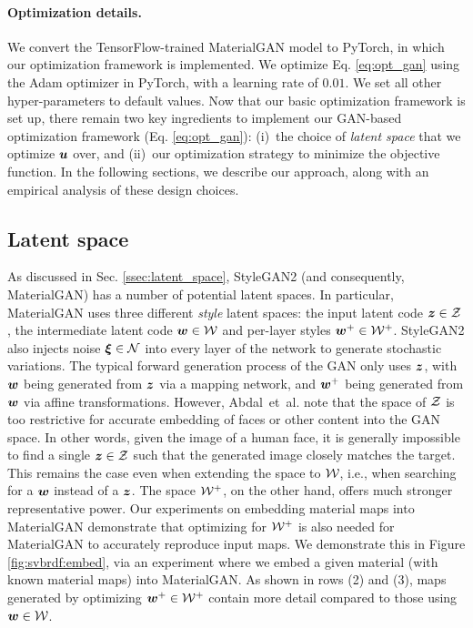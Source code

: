 \paragraph{Optimization details.}
We convert the TensorFlow-trained MaterialGAN model to PyTorch, in which our optimization framework is implemented. We optimize Eq. \ref{eq:opt_gan} using the Adam optimizer in PyTorch, with a learning rate of $0.01$. We set all other hyper-parameters to default values.
Now that our basic optimization framework is set up, there remain two key ingredients to implement our GAN-based optimization framework (Eq. \eqref{eq:opt_gan}): (i)~the choice of \emph{latent space} that we optimize $\bm{u}$ over, and (ii)~our optimization strategy to minimize the objective function. In the following sections, we describe our approach, along with an empirical analysis of these design choices.


\subsection{Latent space}
\label{ssec:latent}

As discussed in Sec. \ref{ssec:latent_space}, StyleGAN2 (and consequently, MaterialGAN) has a number of potential latent spaces.
In particular, MaterialGAN uses three different \emph{style} latent spaces: the input latent code $\bm{z} \in \mathcal{Z}$ , the intermediate latent code $\bm{w} \in \mathcal{W}$ and per-layer styles $\bm{w}^+ \in \mathcal{W}^+$.
StyleGAN2 also injects noise $\bm{\xi} \in \mathcal{N}$ into every layer of the network to generate stochastic variations.
The typical forward generation process of the GAN only uses $\bm{z}$, with $\bm{w}$ being generated from $\bm{z}$ via a mapping network, and $\bm{w}^+$ being generated from $\bm{w}$ via affine transformations.
However, Abdal~et~al. \cite{abdal2019image2stylegan} note that the space of $\mathcal{Z}$ is too restrictive for accurate embedding of faces or other content into the GAN space.
In other words, given the image of a human face, it is generally impossible to find a single $\bm{z} \in \mathcal{Z}$ such that the generated image closely matches the target.
This remains the case even when extending the space to $\mathcal{W}$, i.e., when searching for a $\bm{w}$ instead of a $\bm{z}$.
The space $\mathcal{W}^+$, on the other hand, offers much stronger representative power.
Our experiments on embedding material maps into MaterialGAN demonstrate that optimizing for $\mathcal{W}^+$ is also needed for MaterialGAN to accurately reproduce input maps.
We demonstrate this in Figure \ref{fig:svbrdf:embed}, via an experiment where we embed a given material (with known material maps) into MaterialGAN.
As shown in rows (2) and (3), maps generated by optimizing $\bm{w}^+ \in \mathcal{W}^+$ contain more detail compared to those using $\bm{w} \in \mathcal{W}$.

